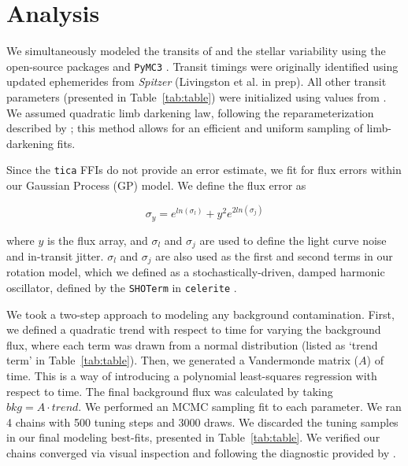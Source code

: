 \documentclass[twocolumn]{aastex631}
\begin{document}
\section{Analysis} \label{sec:analysis}

We simultaneously modeled the transits of \allplanets and the stellar variability using the open-source packages \exoplanet \citep{exoplanet2019, exoplanet2021} and \texttt{PyMC3} \citep{Salvatier16}. Transit timings were originally identified using updated ephemerides from \textit{Spitzer} (Livingston et al. in prep). All other transit parameters (presented in Table~\ref{tab:table}) were initialized using values from \cite{David2019a}. We assumed quadratic limb darkening law, following the reparameterization described by \cite{kipping13}; this method allows for an efficient and uniform sampling of limb-darkening fits.


Since the \texttt{tica} FFIs do not provide an error estimate, we fit for flux errors within our Gaussian Process (GP) model. We define the flux error as

\begin{equation}
    \sigma_y = e^{ln(\sigma_l)} + y^2 e^{2 ln(\sigma_j)}
\end{equation}

where $y$ is the flux array, and $\sigma_l$  and $\sigma_j$ are used to define the light curve noise and in-transit jitter. $\sigma_l$  and $\sigma_j$ are also used as the first and second terms in our rotation model, which we defined as a stochastically-driven, damped harmonic oscillator, defined by the \texttt{SHOTerm} in \texttt{celerite} \citep{dfm17}.

We took a two-step approach to modeling any background contamination. First, we defined a quadratic trend with respect to time for varying the background flux, where each term was drawn from a normal distribution (listed as `trend term' in Table~\ref{tab:table}). Then, we generated a Vandermonde matrix ($A$) of time. This is a way of introducing a polynomial least-squares regression with respect to time. The final background flux was calculated by taking $bkg = A \cdot trend$.  
We performed an MCMC sampling fit to each parameter. We ran 4 chains with 500 tuning steps and 3000 draws. We discarded the tuning samples in our final modeling best-fits, presented in Table~\ref{tab:table}. We verified our chains converged via visual inspection and following the diagnostic provided by \cite{Geweke92}.
\end{document}

